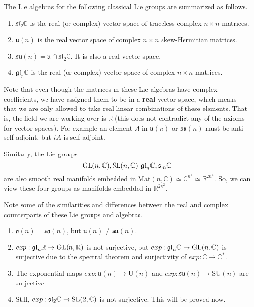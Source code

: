   \begin{theorem}
    The Lie algebras for the following classical Lie groups are summarized as follows. 
    \begin{enumerate}
      \item $\mathfrak{sl}_2 \mathbb{C}$ is the real (or complex) vector space of traceless complex $n \times n$ matrices. 
      \item $\mathfrak{u}(n)$ is the real vector space of complex $n \times n$ skew-Hermitian matrices. 
      \item $\mathfrak{su}(n) = \mathfrak{u} \cap \mathfrak{sl}_2 \mathbb{C}$. It is also a real vector space. 
      \item $\mathfrak{gl}_n \mathbb{C}$ is the real (or complex) vector space of complex $n \times n$ matrices. 
    \end{enumerate}
    Note that even though the matrices in these Lie algebras have complex coefficients, we have assigned them to be in a \textbf{real} vector space, which means that we are only allowed to take real linear combinations of these elements. That is, the field we are working over is $\mathbb{R}$ (this does not contradict any of the axioms for vector spaces). For example an element $A$ in $\mathfrak{u}(n)$ or $\mathfrak{su}(n)$ must be anti-self adjoint, but $iA$ is self adjoint. 
  \end{theorem}

  Similarly, the Lie groups 
  \begin{equation}
    \operatorname{GL}(n, \mathbb{C}), \operatorname{SL}(n, \mathbb{C}), \mathfrak{gl}_n \mathbb{C}, \mathfrak{sl}_n \mathbb{C}
  \end{equation}
  are also smooth real manifolds embedded in Mat$(n, \mathbb{C}) \simeq \mathbb{C}^{n^2} \simeq \mathbb{R}^{2 n^2}$. So, we can view these four groups as manifolds embedded in $\mathbb{R}^{2 n^2}$. 

  Note some of the similarities and differences between the real and complex counterparts of these Lie groups and algebras. 
  \begin{enumerate}
    \item $\mathfrak{o}(n) = \mathfrak{so}(n)$, but $\mathfrak{u}(n) \neq \mathfrak{su}(n)$. 
    \item $exp: \mathfrak{gl}_n \mathbb{R} \rightarrow \operatorname{GL}(n, \mathbb{R})$ is not surjective, but $exp: \mathfrak{gl}_n \mathbb{C} \rightarrow \operatorname{GL}(n, \mathbb{C})$ is surjective due to the spectral theorem and surjectivity of $exp: \mathbb{C} \rightarrow \mathbb{C}^*$.
    \item The exponential maps $exp: \mathfrak{u}(n) \rightarrow \text{U}(n)$ and $exp: \mathfrak{su}(n) \rightarrow \text{SU}(n)$ are surjective. 
    \item Still, $exp: \mathfrak{sl}_2 \mathbb{C} \rightarrow \operatorname{SL}(2, \mathbb{C})$ is not surjective. This will be proved now. 
  \end{enumerate}

